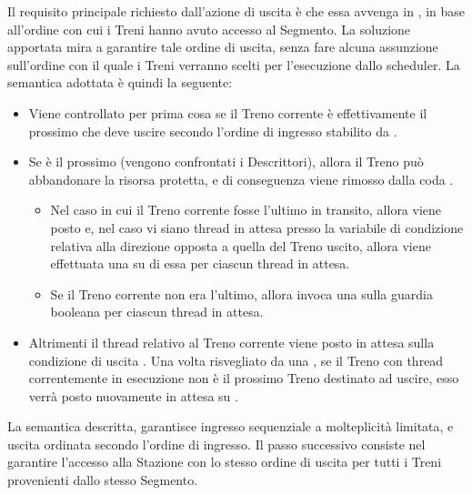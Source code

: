 \begin{description}
			Il requisito principale richiesto dall'azione di uscita è che essa avvenga in , in base all'ordine con cui i Treni hanno avuto accesso al Segmento. La soluzione apportata mira a garantire tale ordine di uscita, senza fare alcuna assunzione sull'ordine con il quale i Treni verranno scelti per l'esecuzione dallo scheduler. La semantica adottata è quindi la seguente:
			\begin{itemize}
				 \item Viene controllato per prima cosa se il Treno corrente è effettivamente il prossimo che deve uscire secondo l'ordine di ingresso stabilito da .
				 \item Se è il prossimo (vengono confrontati i Descrittori), allora il Treno può abbandonare la risorsa protetta, e di conseguenza viene rimosso dalla coda . 
				 \begin{itemize}
				 	\item Nel caso in cui il Treno corrente fosse l'ultimo in transito, allora viene posto  e, nel caso vi siano thread in attesa presso la variabile di condizione relativa alla direzione opposta a quella del Treno uscito, allora viene effettuata una  su di essa per ciascun thread in attesa. 
				 	\item Se il Treno corrente non era l'ultimo, allora invoca una  sulla guardia booleana  per ciascun thread in attesa.
				 \end{itemize}
				 \item Altrimenti il thread relativo al Treno corrente viene posto in attesa sulla condizione di uscita . Una volta risvegliato da una , se il Treno con thread correntemente in esecuzione non è il prossimo Treno destinato ad uscire, esso verrà posto nuovamente in attesa su . 
			\end{itemize}
		\end {description}
	
	La semantica descritta, garantisce ingresso sequenziale a molteplicità limitata, e uscita ordinata secondo l'ordine di ingresso. Il passo successivo consiste nel garantire l'accesso alla Stazione con lo stesso ordine di uscita per tutti i Treni provenienti dallo stesso Segmento.


